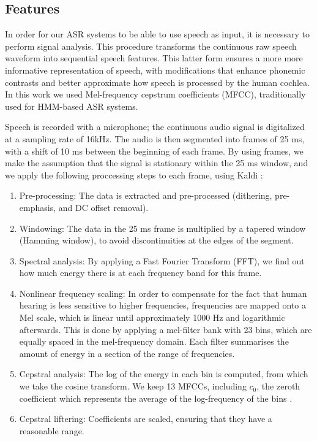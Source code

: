 \subsection{Features}
In order for our ASR systems to be able to use speech as input, it is necessary to perform signal analysis. This procedure transforms the continuous raw speech waveform into sequential speech features. This latter form ensures a more more informative representation of speech, with modifications that enhance phonemic contrasts and better approximate how speech is processed by the human cochlea. In this work we used Mel-frequency cepstrum coefficients (MFCC), traditionally used for HMM-based ASR systems.

Speech is recorded with a microphone; the continuous audio signal is digitalized at a sampling rate of 16kHz.
The audio is then segmented into frames of 25 ms, with a shift of 10 ms between the beginning of each frame. By using frames, we make the assumption that the signal is stationary within the 25 ms window, and we apply the following proccessing steps to each frame, using Kaldi \cite{povey2011}:

\begin{enumerate}
\item Pre-processing: The data is extracted and pre-processed (dithering, pre-emphasis, and DC offset removal).
\item Windowing: The data in the 25 ms frame is multiplied by a tapered window (Hamming window), to avoid discontinuities at the edges of the segment.
\item Spectral analysis: By applying a Fast Fourier Transform (FFT), we find out how much energy there is at each frequency band for this frame.
\item Nonlinear frequency scaling: In order to compensate for the fact that human hearing is less sensitive to higher frequencies, frequencies are mapped onto a Mel scale, which is linear until approximately 1000 Hz and logarithmic afterwards. This is done by applying a mel-filter bank with 23 bins, which are equally spaced in the mel-frequency domain. Each filter summarises the amount of energy in a section of the range of frequencies. 
\item Cepstral analysis: The log of the energy in each bin is computed, from which we take the cosine transform. We keep 13 MFCCs, including $c_{0}$, the zeroth coefficient which represents the average of the log-frequency of the bins \cite{gales2008}.
  \item Cepstral liftering: Coefficients are scaled, ensuring that they have a reasonable range.
\end{enumerate}

